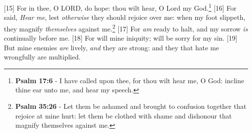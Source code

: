 [15] \textcolor[cmyk]{0.99998,1,0,0}{For in thee, O LORD, do  hope: thou wilt hear, O Lord my God.}\footnote{\textbf{Psalm 17:6} - I have called upon thee, for thou wilt hear me, O God: incline thine ear unto me, and hear my speech.} %
[16] \textcolor[cmyk]{0.99998,1,0,0}{For  said, \emph{Hear} \emph{me}, lest \emph{otherwise} they should rejoice over me: when my foot slippeth, they magnify \emph{themselves} against me.}\footnote{\textbf{Psalm 35:26} - Let them be ashamed and brought to confusion together that rejoice at mine hurt: let them be clothed with shame and dishonour that magnify themselves against me.}
[17] \textcolor[cmyk]{0.99998,1,0,0}{For  \emph{am} ready to halt, and my sorrow \emph{is} continually before me.}
[18] \textcolor[cmyk]{0.99998,1,0,0}{For  will  mine iniquity;  will be sorry for my sin.}
[19] \textcolor[cmyk]{0.99998,1,0,0}{But mine enemies \emph{are} lively, \emph{and} they are strong: and they that hate me wrongfully are multiplied.}
